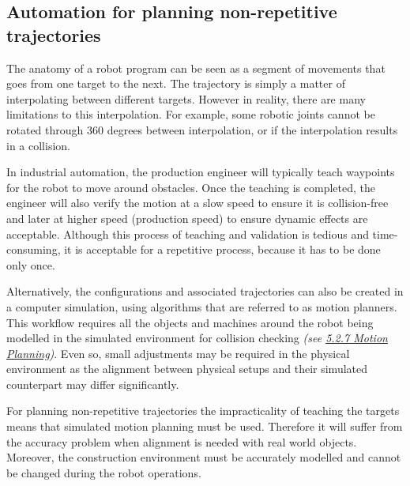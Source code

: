 \subsection{Automation for planning non-repetitive trajectories}

The anatomy of a robot program can be seen as a segment of movements that goes from one target to the next. The trajectory is simply a matter of interpolating between different targets. However in reality, there are many limitations to this interpolation. For example, some robotic joints cannot be rotated through 360 degrees between interpolation, or if the interpolation results in a collision.

In industrial automation, the production engineer will typically teach waypoints for the robot to move around obstacles. Once the teaching is completed, the engineer will also verify the motion at a slow speed to ensure it is collision-free and later at higher speed (production speed) to ensure dynamic effects are acceptable. Although this process of teaching and validation is tedious and time-consuming, it is acceptable for a repetitive process, because it has to be done only once. 

Alternatively, the configurations and associated trajectories can also be created in a computer simulation, using algorithms that are referred to as motion planners\parencite{lavallePlanningAlgorithms2006}. This workflow requires all the objects and machines around the robot being modelled in the simulated environment for collision checking \textit{(see \ul{5.2.7 Motion Planning})}. Even so, small adjustments may be required in the physical environment as the alignment between physical setups and their simulated counterpart may differ significantly.

For planning non-repetitive trajectories the impracticality of teaching the targets means that simulated motion planning must be used. Therefore it will suffer from the accuracy problem when alignment is needed with real world objects. Moreover, the construction environment must be accurately modelled and cannot be changed during the robot operations. 
